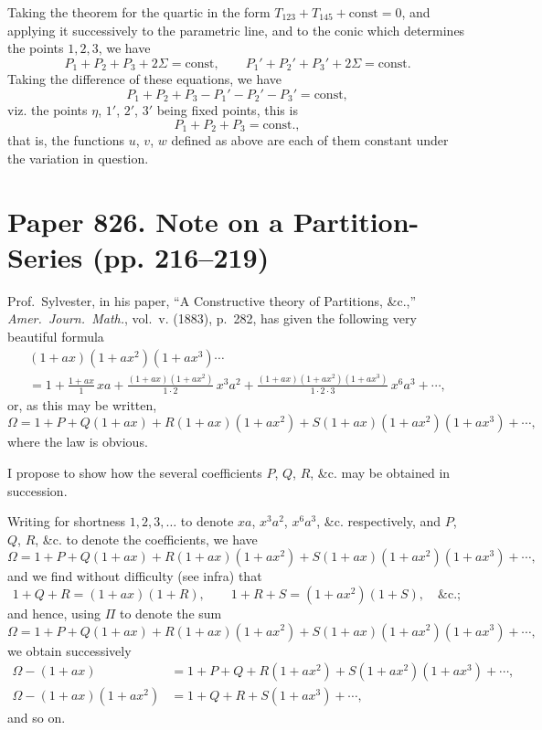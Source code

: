 \documentclass[11pt,a4paper]{book}
\begin{document}
\begin{art}
Taking the theorem for the quartic in the form $T_{123} + T_{145} + \text{const} = 0$, and applying it successively to the parametric line, and to the conic which determines the points $1,2,3$, we have
\[
P_1 + P_2 + P_3 + 2\Sigma = \text{const}, \qquad P_1' + P_2' + P_3' + 2\Sigma = \text{const}.
\]
Taking the difference of these equations, we have
\[
P_1 + P_2 + P_3 - P_1' - P_2' - P_3' = \text{const},
\]
viz. the points $\eta$, $1'$, $2'$, $3'$ being fixed points, this is
\[
P_1 + P_2 + P_3 = \text{const.},
\]
that is, the functions $u$, $v$, $w$ defined as above are each of them constant under the variation in question.
\end{art}

\newpage
\section{Paper 826. Note on a Partition-Series (pp. 216--219)}


Prof.~Sylvester, in his paper, ``A Constructive theory of Partitions, \&c.,'' \textit{Amer.\ Journ.\ Math.}, vol.~v. (1883), p.~282, has given the following very beautiful formula
\begin{multline*}
(1+ax)(1+ax^2)(1+ax^3)\cdots \\
= 1 + \frac{1+ax}{1}\,xa + \frac{(1+ax)(1+ax^2)}{1\cdot 2}\,x^3a^2 + \frac{(1+ax)(1+ax^2)(1+ax^3)}{1\cdot 2\cdot 3}\,x^6a^3 + \cdots,
\end{multline*}
or, as this may be written,
\[
\Omega = 1 + P + Q(1+ax) + R(1+ax)(1+ax^2) + S(1+ax)(1+ax^2)(1+ax^3) + \cdots,
\]
where the law is obvious.

I propose to show how the several coefficients $P$, $Q$, $R$, \&c. may be obtained in succession.

Writing for shortness $1,2,3,\ldots$ to denote $xa$, $x^3a^2$, $x^6a^3$, \&c. respectively, and $P$, $Q$, $R$, \&c. to denote the coefficients, we have
\[
\Omega = 1 + P + Q(1+ax) + R(1+ax)(1+ax^2) + S(1+ax)(1+ax^2)(1+ax^3) + \cdots,
\]
and we find without difficulty (see infra) that
\[
1 + Q + R = (1+ax)(1+R), \qquad 1 + R + S = (1+ax^2)(1+S), \quad \text{\&c.};
\]
and hence, using $\Pi$ to denote the sum
\[
\Omega = 1 + P + Q(1+ax) + R(1+ax)(1+ax^2) + S(1+ax)(1+ax^2)(1+ax^3) + \cdots,
\]
we obtain successively
\begin{align*}
\Omega - (1+ax) &= 1 + P + Q + R(1+ax^2) + S(1+ax^2)(1+ax^3) + \cdots, \\
\Omega - (1+ax)(1+ax^2) &= 1 + Q + R + S(1+ax^3) + \cdots,
\end{align*}
and so on.
\end{document}
